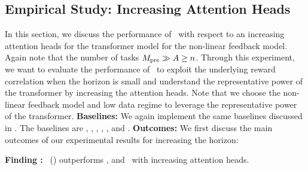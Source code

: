 \documentclass[10pt]{article}
\theoremstyle{plain}
\theoremstyle{definition}
\theoremstyle{remark}
\newcounter{findingcounter}
\newcommand{\customfinding}[1][\normalfont]{\stepcounter{findingcounter}\textbf{Finding \thefindingcounter:}#1 }
\begin{document}
\subsection{Empirical Study: Increasing Attention Heads}
\label{sec:heads}
In this section, we discuss the performance of \pred\ with respect to an increasing attention heads for the transformer model for the non-linear feedback model. Again note that the number of tasks $M_{\text{pre}} \gg A \geq n$.
Through this experiment, we want to evaluate the performance of \pred\ to exploit the underlying reward correlation when the horizon is small and understand the representative power of the transformer by increasing the attention heads.
Note that we choose the non-linear feedback model and low data regime to leverage the representative power of the transformer.
\textbf{Baselines:} We again implement the same baselines discussed in . The baselines are \pred, \predt, \dptg, \ad, \ts, and \linucb.
\textbf{Outcomes:} We first discuss the main outcomes of our experimental results for increasing the horizon:
\begin{tcolorbox}
\customfinding \pred\ (\gt) outperforms \dptg, and \ad\ with increasing attention heads.
\end{tcolorbox}
\end{document}
